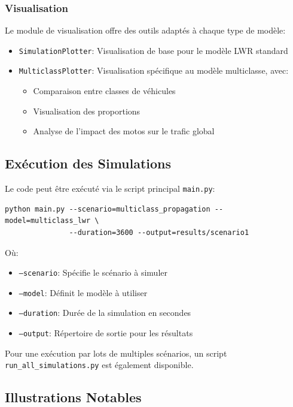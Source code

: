 \subsubsection{Visualisation}
Le module de visualisation offre des outils adaptés à chaque type de modèle:
\begin{itemize}
\item \texttt{SimulationPlotter}: Visualisation de base pour le modèle LWR standard
\item \texttt{MulticlassPlotter}: Visualisation spécifique au modèle multiclasse, avec:
  \begin{itemize}
  \item Comparaison entre classes de véhicules
  \item Visualisation des proportions
  \item Analyse de l'impact des motos sur le trafic global
  \end{itemize}
\end{itemize}

\subsection{Exécution des Simulations}
\label{subsec:execution}

Le code peut être exécuté via le script principal \texttt{main.py}:

\begin{verbatim}
python main.py --scenario=multiclass_propagation --model=multiclass_lwr \
               --duration=3600 --output=results/scenario1
\end{verbatim}

Où:
\begin{itemize}
\item \texttt{--scenario}: Spécifie le scénario à simuler
\item \texttt{--model}: Définit le modèle à utiliser
\item \texttt{--duration}: Durée de la simulation en secondes
\item \texttt{--output}: Répertoire de sortie pour les résultats
\end{itemize}

Pour une exécution par lots de multiples scénarios, un script \texttt{run\_all\_simulations.py} est également disponible.

\subsection{Illustrations Notables}
\label{subsec:illustrations}

